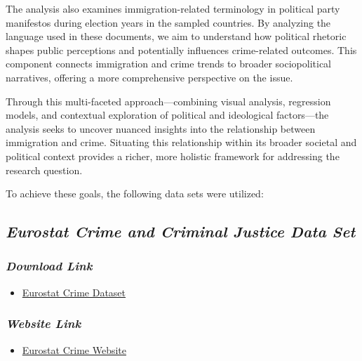 \documentclass[
]{article}
\providecommand{\tightlist}{%
  \setlength{\itemsep}{0pt}\setlength{\parskip}{0pt}}\usepackage{longtable,booktabs,array}
\begin{document}
The analysis also examines immigration-related terminology in political
party manifestos during election years in the sampled countries. By
analyzing the language used in these documents, we aim to understand how
political rhetoric shapes public perceptions and potentially influences
crime-related outcomes. This component connects immigration and crime
trends to broader sociopolitical narratives, offering a more
comprehensive perspective on the issue.

Through this multi-faceted approach---combining visual analysis,
regression models, and contextual exploration of political and
ideological factors---the analysis seeks to uncover nuanced insights
into the relationship between immigration and crime. Situating this
relationship within its broader societal and political context provides
a richer, more holistic framework for addressing the research question.

To achieve these goals, the following data sets were utilized:

\subsection{\texorpdfstring{\emph{Eurostat Crime and Criminal Justice
Data
Set}}{Eurostat Crime and Criminal Justice Data Set}}\label{eurostat-crime-and-criminal-justice-data-set}

\subsubsection{\texorpdfstring{\emph{Download
Link}}{Download Link}}\label{download-link}

\begin{itemize}
\tightlist
\item
  \href{https://ec.europa.eu/eurostat/databrowser/view/crim_just_ctz/default/table?lang=en}{Eurostat
  Crime Dataset}
\end{itemize}

\subsubsection{\texorpdfstring{\emph{Website
Link}}{Website Link}}\label{website-link}

\begin{itemize}
\tightlist
\item
  \href{https://ec.europa.eu/eurostat/databrowser/view/crim_just_ctz/default/table?lang=en}{Eurostat
  Crime Website}
\end{itemize}
\end{document}
